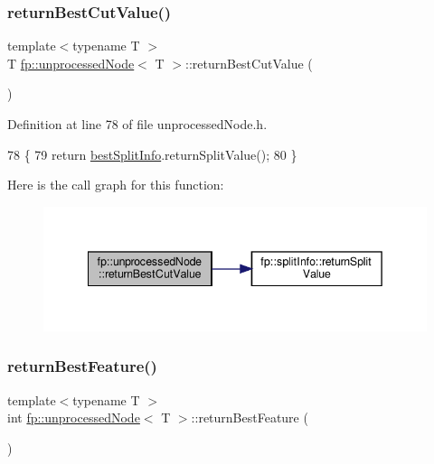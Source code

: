 \subsubsection{\texorpdfstring{return\+Best\+Cut\+Value()}{returnBestCutValue()}}
{\footnotesize\ttfamily template$<$typename T $>$ \\
T \hyperlink{classfp_1_1unprocessedNode}{fp\+::unprocessed\+Node}$<$ T $>$\+::return\+Best\+Cut\+Value (\begin{DoxyParamCaption}{ }\end{DoxyParamCaption})\hspace{0.3cm}{\ttfamily [inline]}}



Definition at line 78 of file unprocessed\+Node.\+h.


\begin{DoxyCode}
78                                              \{
79                     \textcolor{keywordflow}{return} \hyperlink{classfp_1_1unprocessedNode_a9146bd750d1f533e712634873551d060}{bestSplitInfo}.returnSplitValue();
80                 \}
\end{DoxyCode}
Here is the call graph for this function\+:\nopagebreak
\begin{figure}[H]
\begin{center}
\leavevmode
\includegraphics[width=342pt]{classfp_1_1unprocessedNode_ace7db1655a4f21d4d39c989ff1db806b_cgraph}
\end{center}
\end{figure}
\mbox{\label{classfp_1_1unprocessedNode_a32e9c381659db64022fa0491de48f70c}} 
\subsubsection{\texorpdfstring{return\+Best\+Feature()}{returnBestFeature()}}
{\footnotesize\ttfamily template$<$typename T $>$ \\
int \hyperlink{classfp_1_1unprocessedNode}{fp\+::unprocessed\+Node}$<$ T $>$\+::return\+Best\+Feature (\begin{DoxyParamCaption}{ }\end{DoxyParamCaption})\hspace{0.3cm}{\ttfamily [inline]}}



